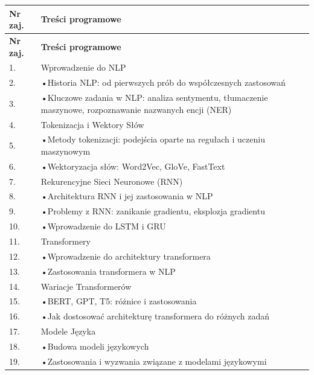 \documentclass[12pt, a4paper]{article}
\newcommand{\thdrule}{\noalign{\global\setlength{\extrarowheight}{0pt}}}
\newcommand{\thdend}{\noalign{\global\setlength{\extrarowheight}{3pt}}}
\begin{document}
{\scriptsize
\begin{longtable}{m{1.5cm}m{14.5cm}}
\thdrule\toprule
\rowcolor{pjatkRed} {\color{white}\textbf{Nr zaj.}} & {\color{white}\textbf{Treści programowe}} \\
\midrule\thdend
\endfirsthead
\thdrule\toprule
\rowcolor{pjatkRed} {\color{white}\textbf{Nr zaj.}} & {\color{white}\textbf{Treści programowe}} \\
\midrule\thdend
\endhead
  \rowcolor{tableRowLight} 1. & Wprowadzenie do NLP \\
  \rowcolor{tableRowAlt} 2. & •Historia NLP: od pierwszych prób do współczesnych zastosowań \\
  \rowcolor{tableRowLight} 3. & •Kluczowe zadania w NLP: analiza sentymentu, tłumaczenie maszynowe, rozpoznawanie nazwanych encji (NER) \\
  \rowcolor{tableRowAlt} 4. & Tokenizacja i Wektory Słów \\
  \rowcolor{tableRowLight} 5. & •Metody tokenizacji: podejścia oparte na regułach i uczeniu maszynowym \\
  \rowcolor{tableRowAlt} 6. & •Wektoryzacja słów: Word2Vec, GloVe, FastText \\
  \rowcolor{tableRowLight} 7. & Rekurencyjne Sieci Neuronowe (RNN) \\
  \rowcolor{tableRowAlt} 8. & •Architektura RNN i jej zastosowania w NLP \\
  \rowcolor{tableRowLight} 9. & •Problemy z RNN: zanikanie gradientu, eksplozja gradientu \\
  \rowcolor{tableRowAlt} 10. & •Wprowadzenie do LSTM i GRU \\
  \rowcolor{tableRowLight} 11. & Transformery \\
  \rowcolor{tableRowAlt} 12. & •Wprowadzenie do architektury transformera \\
  \rowcolor{tableRowLight} 13. & •Zastosowania transformera w NLP \\
  \rowcolor{tableRowAlt} 14. & Wariacje Transformerów \\
  \rowcolor{tableRowLight} 15. & •BERT, GPT, T5: różnice i zastosowania \\
  \rowcolor{tableRowAlt} 16. & •Jak dostosować architekturę transformera do różnych zadań \\
  \rowcolor{tableRowLight} 17. & Modele Języka \\
  \rowcolor{tableRowAlt} 18. & •Budowa modeli językowych \\
  \rowcolor{tableRowLight} 19. & •Zastosowania i wyzwania związane z modelami językowymi \\

\end{longtable}}
\end{document}
